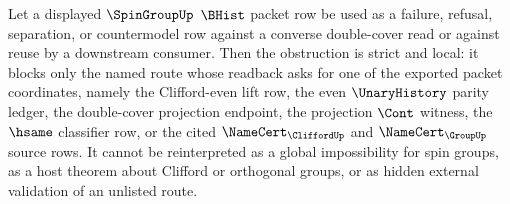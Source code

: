 \begin{corollary}
\label{cor:spingroup-bhist-packet-strict-obstruction}
Let a displayed $\SpinGroupUp$ $\BHist$ packet row be used as a failure, refusal, separation, or countermodel row against a converse double-cover read or against reuse by a downstream consumer. Then the obstruction is strict and local: it blocks only the named route whose readback asks for one of the exported packet coordinates, namely the Clifford-even lift row, the even $\UnaryHistory$ parity ledger, the double-cover projection endpoint, the projection $\Cont$ witness, the $\hsame$ classifier row, or the cited $\NameCert_{\CliffordUp}$ and $\NameCert_{\GroupUp}$ source rows. It cannot be reinterpreted as a global impossibility for spin groups, as a host theorem about Clifford or orthogonal groups, or as hidden external validation of an unlisted route.
\end{corollary}
